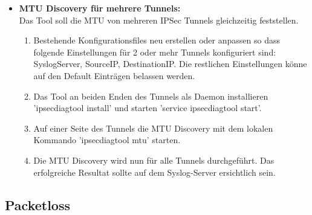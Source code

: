 \begin{itemize}
\item[\Square] \textbf{MTU Discovery für mehrere Tunnels:}\\
Das Tool soll die MTU von mehreren IPSec Tunnels gleichzeitig feststellen.
\begin{enumerate} \itemsep1pt \parskip0pt 
  \item Bestehende Konfigurationsfiles neu erstellen oder anpassen so dass folgende Einstellungen für 2 oder mehr Tunnels konfiguriert sind: SyslogServer, SourceIP, DestinationIP. Die restlichen Einstellungen könne auf den Default Einträgen belassen werden.
  \item Das Tool an beiden Enden des Tunnels als Daemon installieren 'ipsecdiagtool install' und starten 'service ipsecdiagtool start'.
  \item Auf einer Seite des Tunnels die MTU Discovery mit dem lokalen Kommando 'ipsecdiagtool mtu' starten.
  \item Die MTU Discovery wird nun für alle Tunnels durchgeführt. Das erfolgreiche Resultat sollte auf dem Syslog-Server ersichtlich sein.
\end{enumerate}

\end{itemize}
\subsection{Packetloss}
